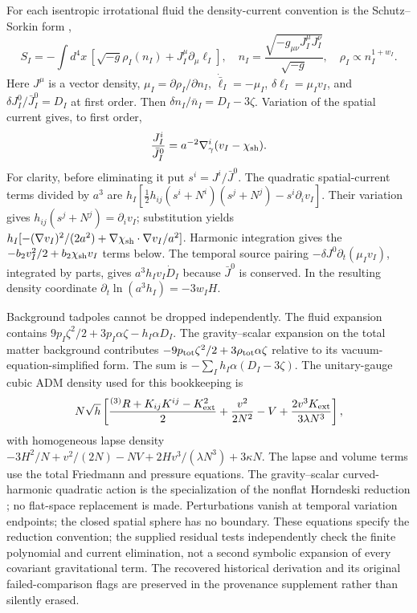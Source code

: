 For each isentropic irrotational fluid the density-current convention is
the Schutz--Sorkin form \cite{DeFelice2017Matter},
\begin{equation}
 S_I=-\int d^4x\,[\sqrt{-g}\rho_I(n_I)+J_I^\mu\partial_\mu\ell_I],
 \quad n_I=\frac{\sqrt{-g_{\mu\nu}J_I^\mu J_I^\nu}}{\sqrt{-g}},
 \quad \rho_I\propto n_I^{1+w_I}.
 \label{eq:app-fluid-action}
\end{equation}
Here $J^\mu$ is a vector density, $\mu_I=\partial\rho_I/\partial n_I$,
$\dot{\bar\ell}_I=-\mu_I$, $\delta\ell_I=\mu_I v_I$, and
$\delta J_I^0/\bar J_I^0=D_I$ at first order. Then
$\delta n_I/\bar n_I=D_I-3\zeta$. Variation of the spatial current
gives, to first order,
\begin{equation}
 \frac{J_I^i}{\bar J_I^0}=a^{-2}\nabla_\gamma^i(v_I-\chi_{\rm sh}).
 \label{eq:app-spatial-current}
\end{equation}
For clarity, before eliminating it put $s^i=J^i/\bar J^0$.
The quadratic spatial-current terms divided by $a^3$ are
$h_I[\tfrac12h_{ij}(s^i+N^i)(s^j+N^j)-s^i\partial_i v_I]$.
Their variation gives $h_{ij}(s^j+N^j)=\partial_i v_I$;
substitution yields $h_I[-(\nabla v_I)^2/(2a^2)
+\nabla\chi_{\rm sh}\cdot\nabla v_I/a^2]$.
Harmonic integration gives the $-b_2v_I^2/2+b_2\chi_{\rm sh}v_I$
terms below. The temporal source pairing
$-\delta J^0\partial_t(\mu_Iv_I)$, integrated by parts, gives
$a^3h_Iv_I\dot D_I$ because $\bar J^0$ is conserved.
In the resulting density coordinate $\partial_t\ln(a^3h_I)=-3w_IH$.

Background tadpoles cannot be dropped independently. The fluid expansion
contains $9p_I\zeta^2/2+3p_I\alpha\zeta-h_I\alpha D_I$.
The gravity--scalar expansion on the total matter background contributes
$-9p_{\rm tot}\zeta^2/2+3\rho_{\rm tot}\alpha\zeta$ relative to its
vacuum-equation-simplified form. The sum is
$-\sum_Ih_I\alpha(D_I-3\zeta)$. The unitary-gauge cubic ADM density
used for this bookkeeping is
\begin{equation}
 N\sqrt h\left[\frac{{}^{(3)}R+K_{ij}K^{ij}-K_{\rm ext}^2}{2}
 +\frac{v^2}{2N^2}-V+\frac{2v^3K_{\rm ext}}{3\lambda N^3}\right],
 \label{eq:app-adm-action}
\end{equation}
with homogeneous lapse density
$-3H^2/N+v^2/(2N)-NV+2Hv^3/(\lambda N^3)+3\kappa N$.
The lapse and volume terms use the total Friedmann and pressure equations.
The gravity--scalar curved-harmonic quadratic action is the specialization
of the nonflat Horndeski reduction \cite{Akama2019Nonflat}; no flat-space
replacement is made. Perturbations vanish at temporal variation endpoints;
the closed spatial sphere has no boundary. These equations specify the
reduction convention; the supplied residual tests independently check the
finite polynomial and current elimination, not a second symbolic expansion
of every covariant gravitational term. The recovered historical derivation
and its original failed-comparison flags are preserved in the provenance
supplement rather than silently erased.

